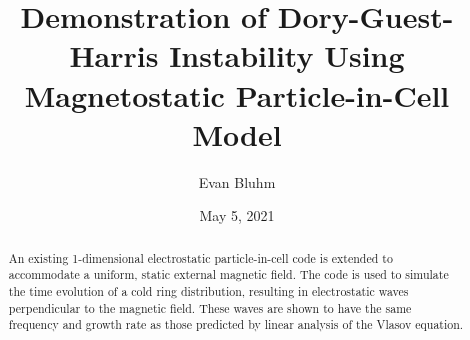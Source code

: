 \documentclass[%
 reprint,
 amsmath,amssymb,
 aps,
]{revtex4-2}
\begin{document}

\title{Demonstration of Dory-Guest-Harris Instability Using\\ Magnetostatic Particle-in-Cell Model}%

\author{Evan Bluhm}




\date{May 5, 2021}%
\begin{abstract}

An existing 1-dimensional electrostatic particle-in-cell code is extended to accommodate a uniform, static external magnetic field. The code is used to simulate the time evolution of a cold ring distribution, resulting in electrostatic waves perpendicular to the magnetic field. These waves are shown to have the same frequency and growth rate as those predicted by linear analysis of the Vlasov equation.

\end{abstract}
\end{document}

